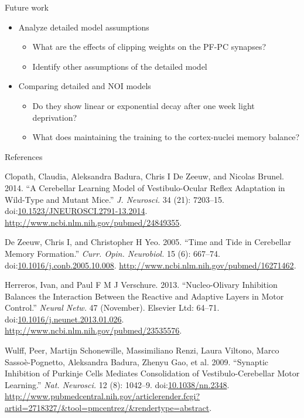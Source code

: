 \documentclass[ignorenonframetext,]{beamer}
\begin{document}
\begin{frame}{Future work}

\begin{itemize}
\itemsep1pt\parskip0pt
\item
  Analyze detailed model assumptions

  \begin{itemize}
  \itemsep1pt\parskip0pt
  \item
    What are the effects of clipping weights on the PF-PC synapses?
  \item
    Identify other assumptions of the detailed model
  \end{itemize}
\item
  Comparing detailed and NOI models

  \begin{itemize}
  \itemsep1pt\parskip0pt
  \item
    Do they show linear or exponential decay after one week light
    deprivation?
  \item
    What does maintaining the training to the cortex-nuclei memory
    balance?
  \end{itemize}
\end{itemize}

\end{frame}

\begin{frame}{References}

Clopath, Claudia, Aleksandra Badura, Chris I {De Zeeuw}, and Nicolas
Brunel. 2014. ``A Cerebellar Learning Model of Vestibulo-Ocular Reflex
Adaptation in Wild-Type and Mutant Mice.'' \emph{J. Neurosci.} 34 (21):
7203--15.
doi:\href{http://dx.doi.org/10.1523/JNEUROSCI.2791-13.2014}{10.1523/JNEUROSCI.2791-13.2014}.
\url{http://www.ncbi.nlm.nih.gov/pubmed/24849355}.

{De Zeeuw}, Chris I, and Christopher H Yeo. 2005. ``Time and Tide in
Cerebellar Memory Formation.'' \emph{Curr. Opin. Neurobiol.} 15 (6):
667--74.
doi:\href{http://dx.doi.org/10.1016/j.conb.2005.10.008}{10.1016/j.conb.2005.10.008}.
\url{http://www.ncbi.nlm.nih.gov/pubmed/16271462}.

Herreros, Ivan, and Paul F M J Verschure. 2013. ``Nucleo-Olivary
Inhibition Balances the Interaction Between the Reactive and Adaptive
Layers in Motor Control.'' \emph{Neural Netw.} 47 (November). Elsevier
Ltd: 64--71.
doi:\href{http://dx.doi.org/10.1016/j.neunet.2013.01.026}{10.1016/j.neunet.2013.01.026}.
\url{http://www.ncbi.nlm.nih.gov/pubmed/23535576}.

Wulff, Peer, Martijn Schonewille, Massimiliano Renzi, Laura Viltono,
Marco Sassoè-Pognetto, Aleksandra Badura, Zhenyu Gao, et al. 2009.
``Synaptic Inhibition of Purkinje Cells Mediates Consolidation of
Vestibulo-Cerebellar Motor Learning.'' \emph{Nat. Neurosci.} 12 (8):
1042--9. doi:\href{http://dx.doi.org/10.1038/nn.2348}{10.1038/nn.2348}.
\url{http://www.pubmedcentral.nih.gov/articlerender.fcgi?artid=2718327/\&tool=pmcentrez/\&rendertype=abstract}.

\end{frame}
\end{document}
